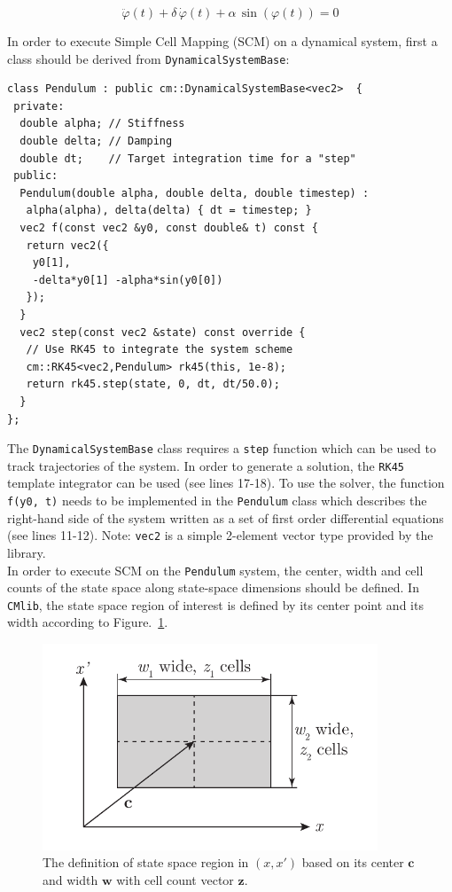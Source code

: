 \documentclass[11pt]{article}
\begin{document}
\[\ddot\varphi(t) + \delta\,\dot\varphi(t) + \alpha\,\sin(\varphi(t))=0\]

In order to execute Simple Cell Mapping (SCM) on a dynamical system, first a class should be derived from \texttt{DynamicalSystemBase}:

\begin{lstlisting}
class Pendulum : public cm::DynamicalSystemBase<vec2>  {
 private:
  double alpha; // Stiffness
  double delta; // Damping
  double dt;    // Target integration time for a "step"
 public:
  Pendulum(double alpha, double delta, double timestep) : 
   alpha(alpha), delta(delta) { dt = timestep; }
  vec2 f(const vec2 &y0, const double& t) const {
   return vec2({
    y0[1],
    -delta*y0[1] -alpha*sin(y0[0])
   });
  }
  vec2 step(const vec2 &state) const override {
   // Use RK45 to integrate the system scheme
   cm::RK45<vec2,Pendulum> rk45(this, 1e-8);
   return rk45.step(state, 0, dt, dt/50.0);
  }
};
\end{lstlisting}

The \texttt{DynamicalSystemBase} class requires a \texttt{step} function which can be used to track trajectories of the system. In order to generate a solution, the \texttt{RK45} template integrator can be used (see lines 17-18). To use the solver,  the function \texttt{f(y0, t)} needs to be implemented in the \texttt{Pendulum} class which describes the right-hand side of the system written as a set of first order differential equations (see lines 11-12). Note: \texttt{vec2} is a simple 2-element vector type provided by the library.\\

In order to execute SCM on the \texttt{Pendulum} system, the center, width and cell counts of the state space along state-space dimensions should be defined. In \texttt{CMlib}, the state space region of interest is defined by its center point and its width according to Figure.~\ref{fig:statespace}.

\begin{figure}[htb]
	\centering
	\includegraphics[width=10cm]{fig/state-space-region.pdf}
	\caption{The definition of state space region in $(x,x')$ based on its center $\mathbf{c}$ and width $\mathbf{w}$ with cell count vector $\mathbf{z}$.} \label{fig:statespace}
\end{figure}
\end{document}
